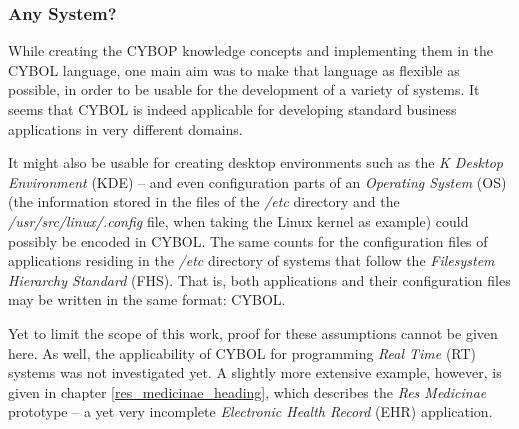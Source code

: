 %
%
%
%
%
%
%

\subsubsection{Any System?}
\label{any_system_heading}

While creating the CYBOP knowledge concepts and implementing them in the CYBOL
language, one main aim was to make that language as flexible as possible, in
order to be usable for the development of a variety of systems. It seems that
CYBOL is indeed applicable for developing standard business applications in
very different domains.

It might also be usable for creating desktop environments such as the
\emph{K Desktop Environment} (KDE) \cite{kde} -- and even configuration parts
of an \emph{Operating System} (OS) (the information stored in the files of the
\emph{/etc} directory and the \emph{/usr/src/linux/.config} file, when taking
the Linux kernel as example) could possibly be encoded in CYBOL. The same
counts for the configuration files of applications residing in the \emph{/etc}
directory of systems that follow the \emph{Filesystem Hierarchy Standard}
(FHS). That is, both applications and their configuration files may be written
in the same format: CYBOL.

Yet to limit the scope of this work, proof for these assumptions cannot be
given here. As well, the applicability of CYBOL for programming \emph{Real Time}
(RT) systems was not investigated yet. A slightly more extensive example,
however, is given in chapter \ref{res_medicinae_heading}, which describes the
\emph{Res Medicinae} prototype -- a yet very incomplete
\emph{Electronic Health Record} (EHR) application.
